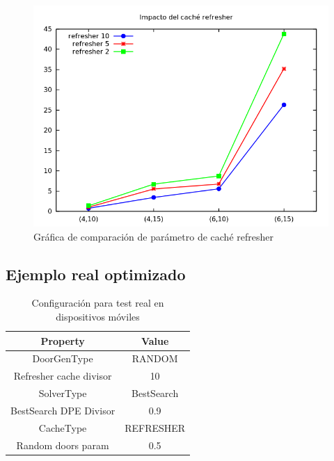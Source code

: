 \begin{figure}[H]
\centering
\includegraphics[scale=0.5]{img/refresher}
\caption{Gráfica de comparación de parámetro de caché refresher
\label{fig:grfrefresher}}
\end{figure}



\subsection{Ejemplo real optimizado}


\begin{table}[H]
\begin{center}
	\begin{tabular}{ | c | c | }
\hline
 		Property & Value \\ \hline
DoorGenType & RANDOM \\ 
Refresher cache divisor & 10 \\ 
SolverType & BestSearch \\ 
BestSearch DPE Divisor & 0.9 \\ 
CacheType & REFRESHER \\ 
Random doors param & 0.5 \\ 
\hline
	\end{tabular}
\end{center}
\caption{Configuración para test real en dispositivos móviles}
\label{table:cfg-optreal}
\end{table}


